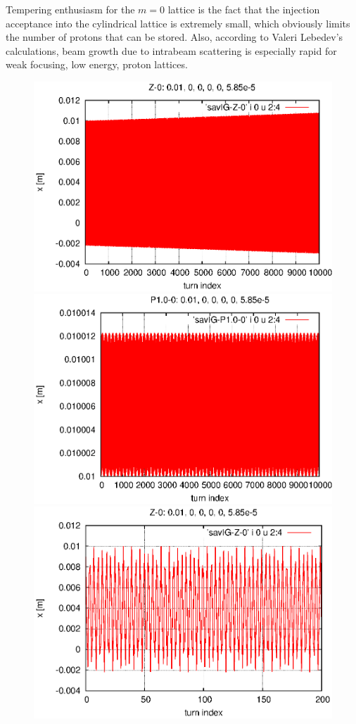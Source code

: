 \documentclass[]{article}
\begin{document}
Tempering enthusiasm for the $m=0$ lattice is the fact that 
the injection acceptance into the cylindrical lattice is extremely small, 
which obviously limits the number of protons that can be stored.
Also, according to Valeri Lebedev's calculations, beam growth due
to intrabeam scattering is especially rapid for weak focusing,
low energy, proton lattices.

%
\begin{figure}[h]
\centering
\includegraphics[scale=0.5]{eps/xEvolve0.Z.eps}
\includegraphics[scale=0.5]{eps/xEvolve0.P1.0.eps}
\includegraphics[scale=0.5]{eps/xEvolve0.Z-200turn.eps}

\end{figure}
\end{document}
